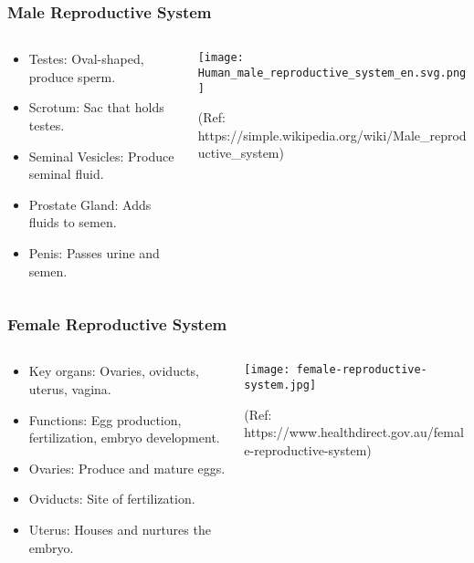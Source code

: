 \begin{frame}[fragile]\frametitle{Male Reproductive System}
\begin{columns}
    \begin{column}[T]{0.5\linewidth}
      \begin{itemize}
		\item Testes: Oval-shaped, produce sperm.
		\item Scrotum: Sac that holds testes.
		\item Seminal Vesicles: Produce seminal fluid.
		\item Prostate Gland: Adds fluids to semen.
		\item Penis: Passes urine and semen.
	  \end{itemize}
    \end{column}
    \begin{column}[T]{0.5\linewidth}
		\begin{center}
		\texttt{[image: Human\_male\_reproductive\_system\_en.svg.png]}
		
		{\tiny (Ref: https://simple.wikipedia.org/wiki/Male\_reproductive\_system)}
		\end{center}	
    \end{column}
  \end{columns}
\end{frame}

\begin{frame}[fragile]\frametitle{Female Reproductive System}
\begin{columns}
    \begin{column}[T]{0.5\linewidth}
      \begin{itemize}
		\item Key organs: Ovaries, oviducts, uterus, vagina.
		\item Functions: Egg production, fertilization, embryo development.
		\item Ovaries: Produce and mature eggs.
		\item Oviducts: Site of fertilization.
		\item Uterus: Houses and nurtures the embryo.
	  \end{itemize}
    \end{column}
    \begin{column}[T]{0.5\linewidth}
		\begin{center}
		\texttt{[image: female-reproductive-system.jpg]}
		
		{\tiny (Ref: https://www.healthdirect.gov.au/female-reproductive-system)}		
		\end{center}	
    \end{column}
  \end{columns}
\end{frame}

